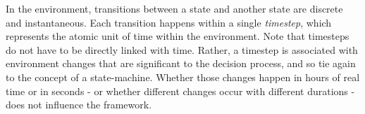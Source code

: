 
In the environment, transitions between a state and another state are discrete and instantaneous.
Each transition happens within a single \textit{timestep}, which represents the atomic unit of time
within the environment. Note that timesteps do not have to be directly linked with time. Rather, a
timestep is associated with environment changes that are significant to the decision process, and so
tie again to the concept of a state-machine. Whether those changes happen in hours of real time or
in seconds - or whether different changes occur with different durations - does not influence the
framework.

%

